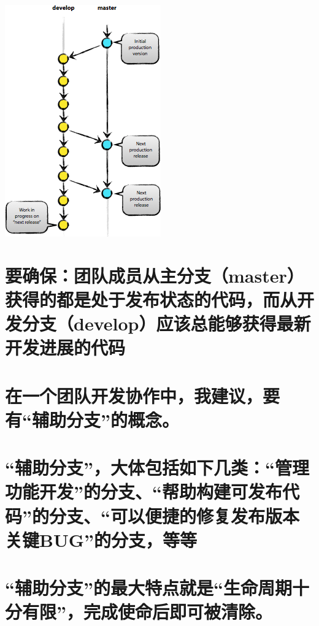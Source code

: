 \documentclass[11pt]{article}
\begin{document}
\includegraphics[width=.9\linewidth]{images/105026.png}
\section{要确保：团队成员从主分支（master）获得的都是处于发布状态的代码，而从开发分支（develop）应该总能够获得最新开发进展的代码}
\label{sec-3}
\section{在一个团队开发协作中，我建议，要有“辅助分支”的概念。}
\label{sec-4}
\section{“辅助分支”，大体包括如下几类：“管理功能开发”的分支、“帮助构建可发布代码”的分支、“可以便捷的修复发布版本关键BUG”的分支，等等}
\label{sec-5}
\section{“辅助分支”的最大特点就是“生命周期十分有限”，完成使命后即可被清除。}
\label{sec-6}
\end{document}
